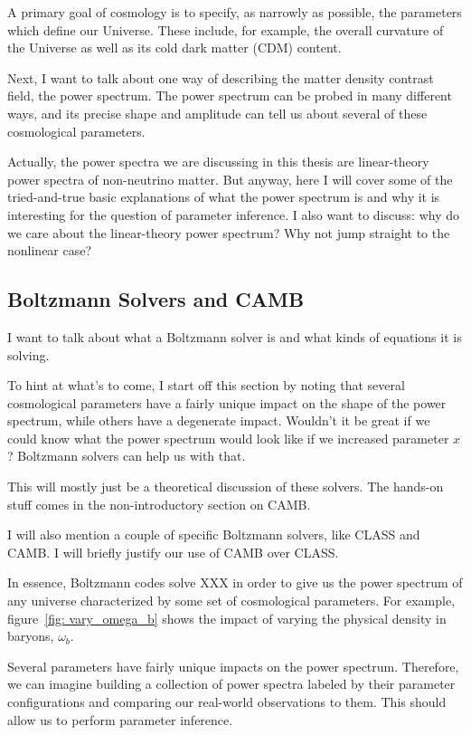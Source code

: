 \documentclass[11pt]{article}
\begin{document}
A primary goal of cosmology is to specify, as narrowly as possible, the parameters which define our Universe. These include, for example, the overall curvature of the Universe as well as its cold dark matter (CDM) content.

Next, I want to talk about one way of describing the matter density contrast field, the power spectrum. The power spectrum can be probed in many different ways, and its precise shape and amplitude can tell us about several of these cosmological parameters.

Actually, the power spectra we are discussing in this thesis are linear-theory power spectra of non-neutrino matter. But anyway, here I will cover some of the tried-and-true basic explanations of what the power spectrum is and why it is interesting for the question of parameter inference. I also want to discuss: why do we care about the linear-theory power spectrum? Why not jump straight to the nonlinear case?

\begin{centering}
\subsection{Boltzmann Solvers and CAMB}
\end{centering}

I want to talk about what a Boltzmann solver is and what kinds of equations it is solving.

To hint at what's to come, I start off this section by noting that several cosmological parameters have a fairly unique impact on the shape of the power spectrum, while others have a degenerate impact. Wouldn't it be great if we could know what the power spectrum would look like if we increased parameter $x$? Boltzmann solvers can help us with that.

This will mostly just be a theoretical discussion of these solvers. The hands-on stuff comes in the non-introductory section on CAMB.

I will also mention a couple of specific Boltzmann solvers, like CLASS and CAMB. I will briefly justify our use of CAMB over CLASS.


In essence, Boltzmann codes solve XXX in order to give us the power spectrum
of any universe characterized by some set of cosmological parameters. For
example, figure~\ref{fig: vary_omega_b} shows the impact of varying the
physical density in baryons, $\omega_b$. 

Several parameters have fairly unique impacts on the power spectrum.
Therefore, we can imagine building a collection of power spectra labeled by
their parameter configurations and comparing our real-world observations to
them. This should allow us to perform parameter inference.
\end{document}
